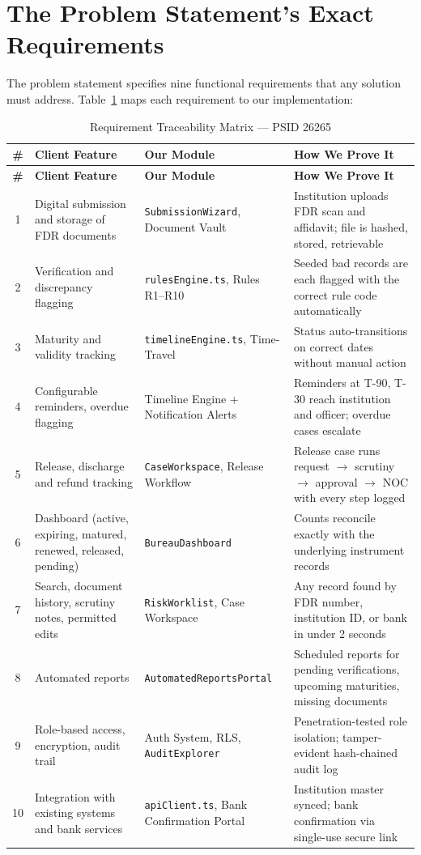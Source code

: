 \documentclass[12pt, a4paper]{report}
\begin{document}
\section{The Problem Statement's Exact Requirements}

The problem statement specifies nine functional requirements that any solution must address. Table~\ref{tab:requirements} maps each requirement to our implementation:

\begin{longtable}{|c|p{4cm}|p{4cm}|p{4cm}|}
\caption{Requirement Traceability Matrix — PSID 26265} \label{tab:requirements} \\
\hline
\textbf{\#} & \textbf{Client Feature} & \textbf{Our Module} & \textbf{How We Prove It} \\
\hline
\endfirsthead
\hline
\textbf{\#} & \textbf{Client Feature} & \textbf{Our Module} & \textbf{How We Prove It} \\
\hline
\endhead
1 & Digital submission and storage of FDR documents & \texttt{SubmissionWizard}, Document Vault & Institution uploads FDR scan and affidavit; file is hashed, stored, retrievable \\
\hline
2 & Verification and discrepancy flagging & \texttt{rulesEngine.ts}, Rules R1--R10 & Seeded bad records are each flagged with the correct rule code automatically \\
\hline
3 & Maturity and validity tracking & \texttt{timelineEngine.ts}, Time-Travel & Status auto-transitions on correct dates without manual action \\
\hline
4 & Configurable reminders, overdue flagging & Timeline Engine + Notification Alerts & Reminders at T-90, T-30 reach institution and officer; overdue cases escalate \\
\hline
5 & Release, discharge and refund tracking & \texttt{CaseWorkspace}, Release Workflow & Release case runs request $\rightarrow$ scrutiny $\rightarrow$ approval $\rightarrow$ NOC with every step logged \\
\hline
6 & Dashboard (active, expiring, matured, renewed, released, pending) & \texttt{BureauDashboard} & Counts reconcile exactly with the underlying instrument records \\
\hline
7 & Search, document history, scrutiny notes, permitted edits & \texttt{RiskWorklist}, Case Workspace & Any record found by FDR number, institution ID, or bank in under 2 seconds \\
\hline
8 & Automated reports & \texttt{AutomatedReportsPortal} & Scheduled reports for pending verifications, upcoming maturities, missing documents \\
\hline
9 & Role-based access, encryption, audit trail & Auth System, RLS, \texttt{AuditExplorer} & Penetration-tested role isolation; tamper-evident hash-chained audit log \\
\hline
10 & Integration with existing systems and bank services & \texttt{apiClient.ts}, Bank Confirmation Portal & Institution master synced; bank confirmation via single-use secure link \\
\hline
\end{longtable}
\end{document}
